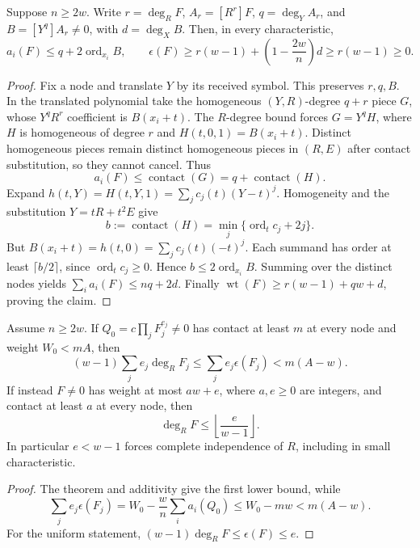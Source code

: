 \begin{theorem}
\label{thm:contact-universal-resource}
Suppose $n\ge2w$. Write $r=\deg_R F$, $A_r=[R^r]F$,
$q=\deg_Y A_r$, and $B=[Y^q]A_r\ne0$, with $d=\deg_X B$.
Then, in every characteristic,
\begin{equation}
 a_i(F)\le q+2\operatorname{ord}_{x_i}B,\qquad
 \epsilon(F)\ge r(w-1)+\left(1-\frac{2w}{n}\right)d
 \ge r(w-1)\ge0.
 \label{eq:contact-average-bound}
\end{equation}
\end{theorem}
\begin{proof}
Fix a node and translate $Y$ by its received symbol. This preserves
$r,q,B$. In the translated polynomial take the homogeneous
$(Y,R)$-degree $q+r$ piece $G$, whose $Y^qR^r$ coefficient is
$B(x_i+t)$. The $R$-degree bound forces $G=Y^qH$, where $H$ is
homogeneous of degree $r$ and $H(t,0,1)=B(x_i+t)$.
Distinct homogeneous pieces remain distinct homogeneous pieces in
$(R,E)$ after contact substitution, so they cannot cancel. Thus
\[
 a_i(F)\le\operatorname{contact}(G)
 =q+\operatorname{contact}(H).
\]
Expand $h(t,Y)=H(t,Y,1)=\sum_j c_j(t)(Y-t)^j$.
Homogeneity and the substitution $Y=tR+t^2E$ give
\[
 b:=\operatorname{contact}(H)=\min_j\{\operatorname{ord}_t c_j+2j\}.
\]
But $B(x_i+t)=h(t,0)=\sum_j c_j(t)(-t)^j$.
Each summand has order at least $\lceil b/2\rceil$, since
$\operatorname{ord}_t c_j\ge0$. Hence $b\le2\operatorname{ord}_{x_i}B$.
Summing over the distinct nodes yields $\sum_i a_i(F)\le nq+2d$.
Finally $\operatorname{wt}(F)\ge r(w-1)+qw+d$, proving the claim.
\end{proof}

\begin{corollary}
\label{cor:contact-factor-resource}
\label{thm:contact-regular-gap}
Assume $n\ge2w$. If $Q_0=c\prod_j F_j^{e_j}\ne0$ has contact at
least $m$ at every node and weight $W_0<mA$, then
\begin{equation}
 (w-1)\sum_j e_j\deg_R F_j
 \le\sum_j e_j\epsilon(F_j)<m(A-w).
 \label{eq:contact-additive-resource}
\end{equation}
If instead $F\ne0$ has weight at most $aw+e$, where $a,e\ge0$ are
integers, and contact at least $a$ at every node, then
\[
 \deg_R F\le\left\lfloor\frac e{w-1}\right\rfloor.
\]
In particular $e<w-1$ forces complete independence of $R$, including
in small characteristic.
\end{corollary}
\begin{proof}
The theorem and additivity give the first lower bound, while
\[
 \sum_j e_j\epsilon(F_j)=W_0-\frac wn\sum_i a_i(Q_0)
 \le W_0-mw<m(A-w).
\]
For the uniform statement, $(w-1)\deg_R F\le\epsilon(F)\le e$.
\end{proof}

